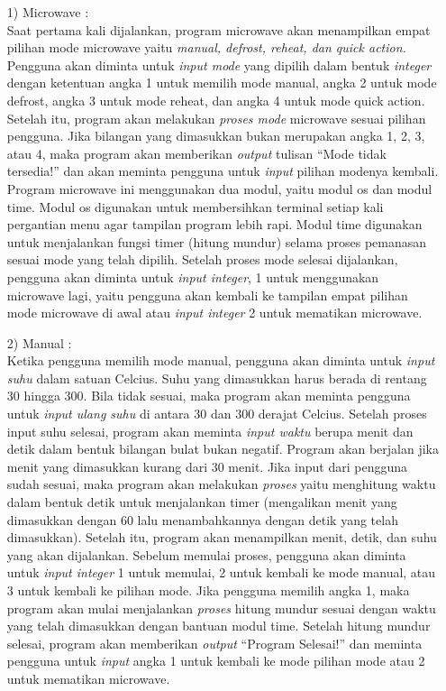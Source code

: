 \documentclass[conference]{IEEEtran}
\begin{document}
\begin{enumerate}
\item[1)] Microwave :\\
Saat pertama kali dijalankan, program microwave akan menampilkan empat pilihan mode microwave yaitu \textit{manual, defrost, reheat, dan quick action.} Pengguna akan diminta 
untuk \textit{input mode} yang dipilih dalam bentuk \textit{integer} dengan ketentuan angka 1 untuk memilih mode manual, angka 2 untuk mode defrost, angka 3 untuk mode reheat, 
dan angka 4 untuk mode quick action. Setelah itu, program akan melakukan \textit{proses mode} microwave sesuai pilihan pengguna. Jika bilangan yang dimasukkan bukan merupakan angka 1, 2, 3, atau 4, 
maka program akan memberikan \textit{output} tulisan “Mode tidak tersedia!” dan akan meminta pengguna untuk \textit{input} pilihan modenya kembali. Program microwave ini menggunakan dua modul, yaitu modul os 
dan modul time. Modul os digunakan untuk membersihkan terminal setiap kali pergantian menu agar tampilan program lebih rapi. Modul time digunakan untuk menjalankan fungsi timer (hitung mundur) 
selama proses pemanasan sesuai mode yang telah dipilih. Setelah proses mode selesai dijalankan, pengguna akan diminta untuk \textit{input integer}, 1 untuk menggunakan microwave lagi, yaitu pengguna akan 
kembali ke tampilan empat pilihan mode microwave di awal atau \textit{input integer} 2 untuk mematikan microwave.
 
\item[2)] Manual : \\
Ketika pengguna memilih mode manual, pengguna akan diminta untuk \textit{input suhu} dalam satuan Celcius. Suhu yang dimasukkan harus berada di rentang 30 hingga 300. Bila tidak sesuai, maka program akan meminta 
pengguna untuk \textit{input ulang suhu} di antara 30 dan 300 derajat Celcius. Setelah proses input suhu selesai, program akan meminta \textit{input waktu} berupa menit dan detik dalam bentuk bilangan bulat bukan negatif. 
Program akan berjalan jika menit yang dimasukkan kurang dari 30 menit. Jika input dari pengguna sudah sesuai, maka program akan melakukan \textit{proses} yaitu menghitung waktu dalam bentuk detik untuk menjalankan timer (mengalikan 
menit yang dimasukkan dengan 60 lalu menambahkannya dengan detik yang telah dimasukkan). Setelah itu, program akan menampilkan menit, detik, dan suhu yang akan dijalankan. Sebelum memulai proses, pengguna akan diminta 
untuk \textit{input integer} 1 untuk memulai, 2 untuk kembali ke mode manual, atau 3 untuk kembali ke pilihan mode. Jika pengguna memilih angka 1, maka program akan mulai menjalankan \textit{proses} hitung mundur sesuai dengan waktu 
yang telah dimasukkan dengan bantuan modul time. Setelah hitung mundur selesai, program akan memberikan \textit{output} “Program Selesai!” dan meminta pengguna untuk \textit{input} angka 1 untuk kembali ke mode pilihan mode atau 2 untuk 
mematikan microwave.


\end{enumerate}
\end{document}
